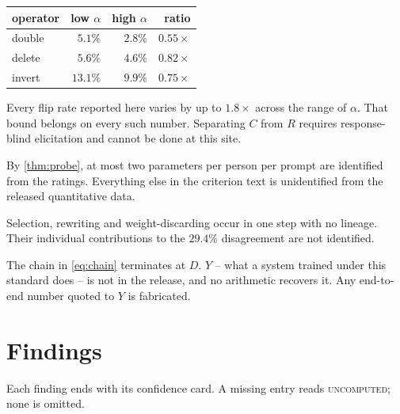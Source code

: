 \begin{table}[H]\centering\small
\begin{tabular}{lrrr}
\toprule
operator & low $\alpha$ & high $\alpha$ & ratio\\
\midrule
double & $5.1\%$ & $2.8\%$ & $0.55\times$\\
delete & $5.6\%$ & $4.6\%$ & $0.82\times$\\
invert & $13.1\%$ & $9.9\%$ & $0.75\times$\\
\bottomrule
\end{tabular}
\end{table}

\begin{corollary}
Every flip rate reported here varies by up to $1.8\times$ across the range of
$\alpha$. That bound belongs on every such number. Separating $C$ from $R$
requires response-blind elicitation and cannot be done at this site.
\end{corollary}

\begin{proposition}
By \cref{thm:probe}, at most two parameters per person per prompt are identified
from the ratings. Everything else in the criterion text is unidentified from the
released quantitative data.
\end{proposition}

\begin{proposition}
Selection, rewriting and weight-discarding occur in one step with no lineage.
Their individual contributions to the $29.4\%$ disagreement are not identified.
\end{proposition}

\begin{proposition}
The chain in \cref{eq:chain} terminates at $D$. $Y$ -- what a system trained under
this standard does -- is not in the release, and no arithmetic recovers it. Any
end-to-end number quoted to $Y$ is fabricated.
\end{proposition}

\section{Findings}
\label{sec:findings}

Each finding ends with its confidence card. A missing entry reads
\textsc{uncomputed}; none is omitted.

